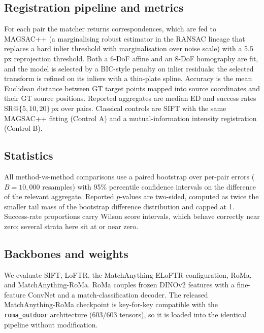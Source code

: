 \documentclass[fleqn,10pt]{wlscirep}
\begin{document}
\subsection*{Registration pipeline and metrics}

For each pair the matcher returns correspondences, which are fed to MAGSAC++\cite{barath2020magsac} (a marginalising robust estimator in the RANSAC\cite{fischler1981ransac} lineage that replaces a hard inlier threshold with marginalisation over noise scale) with a 5.5\,px reprojection threshold. Both a 6-DoF affine and an 8-DoF homography are fit, and the model is selected by a BIC-style penalty on inlier residuals; the selected transform is refined on its inliers with a thin-plate spline\cite{bookstein1989tps}. Accuracy is the mean Euclidean distance between GT target points mapped into source coordinates and their GT source positions. Reported aggregates are median ED and success rates SR@$\{5,10,20\}$\,px over pairs. Classical controls are SIFT\cite{lowe2004sift} with the same MAGSAC++ fitting (Control A) and a mutual-information intensity registration\cite{maes1997mutualinfo} (Control B).

\subsection*{Statistics}

All method-vs-method comparisons use a paired bootstrap over per-pair errors ($B=10{,}000$ resamples) with 95\% percentile confidence intervals on the difference of the relevant aggregate. Reported $p$-values are two-sided, computed as twice the smaller tail mass of the bootstrap difference distribution and capped at 1. Success-rate proportions carry Wilson score intervals, which behave correctly near zero; several strata here sit at or near zero.

\subsection*{Backbones and weights}

We evaluate SIFT, LoFTR\cite{sun2021loftr}, the MatchAnything-ELoFTR\cite{wang2024efficientloftr,he2025matchanything} configuration, RoMa\cite{edstedt2024roma}, and MatchAnything-RoMa\cite{he2025matchanything}. RoMa couples frozen DINOv2 features\cite{oquab2024dinov2} with a fine-feature ConvNet and a match-classification decoder. The released MatchAnything-RoMa checkpoint is key-for-key compatible with the \texttt{roma\_outdoor} architecture (603/603 tensors), so it is loaded into the identical pipeline without modification.
\end{document}
